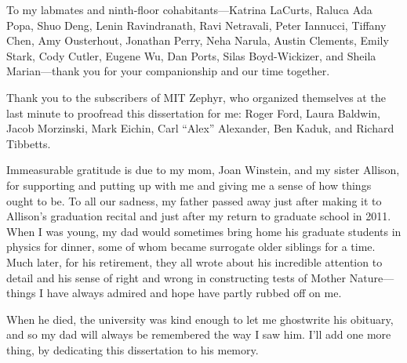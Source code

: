 To my labmates and ninth-floor cohabitants---Katrina LaCurts, Raluca
Ada Popa, Shuo Deng, Lenin Ravindranath, Ravi Netravali, Peter
Iannucci, Tiffany Chen, Amy Ousterhout, Jonathan Perry, Neha Narula,
Austin Clements, Emily Stark, Cody Cutler, Eugene Wu, Dan Ports, Silas
Boyd-Wickizer, and Sheila Marian---thank you for your companionship
and our time together.

Thank you to the subscribers of MIT Zephyr, who
organized themselves at the last minute to proofread this
dissertation for me: Roger Ford, Laura Baldwin, Jacob Morzinski, Mark Eichin, Carl
``Alex'' Alexander, Ben Kaduk, and Richard Tibbetts.

Immeasurable gratitude is due to my mom, Joan Winstein, and my sister Allison,
for supporting and putting up with me and giving me a sense of how
things ought to be. To all our sadness, my father passed away just
after making it to Allison's graduation recital and just after my return
to graduate school in 2011. When I was young, my dad would sometimes
bring home his graduate students in physics for dinner, some of whom
became surrogate older siblings for a time. Much later, for his
retirement, they all wrote about his incredible attention to detail
and his sense of right and wrong in constructing tests of Mother
Nature---things I have always admired and hope have partly
rubbed off on me.

When he died, the university was kind enough to let me ghostwrite his
obituary, and so my dad will always be remembered the way I saw
him. I'll add one more thing, by dedicating this dissertation to his
memory.

